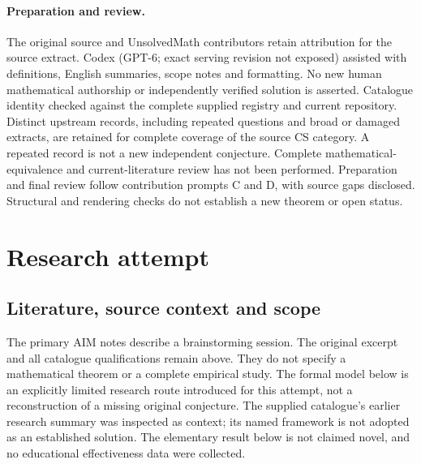 \documentclass[11pt]{article}
\begin{document}
\paragraph{Preparation and review.}
The original source and UnsolvedMath contributors retain attribution for the source extract. Codex (GPT-6; exact serving revision not exposed) assisted with definitions, English summaries, scope notes and formatting. No new human mathematical authorship or independently verified solution is asserted. Catalogue identity checked against the complete supplied registry and current repository. Distinct upstream records, including repeated questions and broad or damaged extracts, are retained for complete coverage of the source CS category. A repeated record is not a new independent conjecture. Complete mathematical-equivalence and current-literature review has not been performed. Preparation and final review follow contribution prompts C and D, with source gaps disclosed. Structural and rendering checks do not establish a new theorem or open status.
\label{end:statement}

\section{Research attempt}
\subsection{Literature, source context and scope}
The primary AIM notes describe a brainstorming session. The original excerpt and all catalogue qualifications remain above. They do not specify a mathematical theorem or a complete empirical study. The formal model below is an explicitly limited research route introduced for this attempt, not a reconstruction of a missing original conjecture. The supplied catalogue's earlier research summary was inspected as context; its named framework is not adopted as an established solution. The elementary result below is not claimed novel, and no educational effectiveness data were collected.
\end{document}
